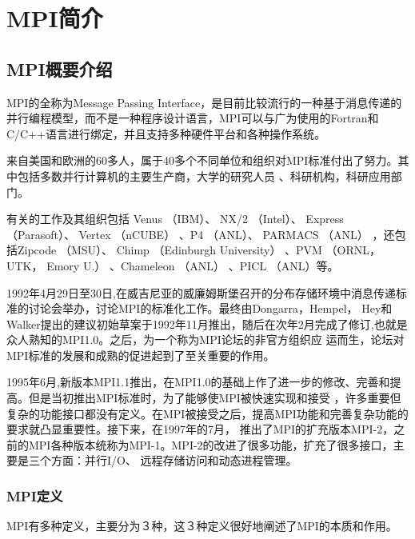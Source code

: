 
\chapter[MPI简介]{MPI简介}
\section{MPI概要介绍}
MPI的全称为Message Passing Interface，是目前比较流行的一种基于消息传递的并行编程模型，而不是一种程序设计语言，MPI可以与广为使用的Fortran和C/C++语言进行绑定，并且支持多种硬件平台和各种操作系统。

来自美国和欧洲的60多人，属于40多个不同单位和组织对MPI标准付出了努力。其中包括多数并行计算机的主要生产商，大学的研究人员
、科研机构，科研应用部门。

有关的工作及其组织包括 Venus （IBM）、 NX/2 （Intel）、 Express （Parasoft）、 Vertex （nCUBE） 、P4 （ANL）、 PARMACS （ANL） ，还包括Zipcode （MSU）、 Chimp （Edinburgh University） 、PVM （ORNL， UTK， Emory U.） 、Chameleon （ANL） 、PICL （ANL）等。

1992年4月29日至30日,在威吉尼亚的威廉姆斯堡召开的分布存储环境中消息传递标准的讨论会举办，讨论MPI的标准化工作。最终由Dongarra，Hempel，
Hey和Walker提出的建议初始草案于1992年11月推出，随后在次年2月完成了修订,也就是众人熟知的MPI1.0。之后，为一个称为MPI论坛的非官方组织应
运而生，论坛对MPI标准的发展和成熟的促进起到了至关重要的作用。

1995年6月,新版本MPI1.1推出，在MPI1.0的基础上作了进一步的修改、完善和提高。但是当初推出MPI标准时，为了能够使MPI被快速实现和接受
，许多重要但复杂的功能接口都没有定义。在MPI被接受之后，提高MPI功能和完善复杂功能的要求就凸显重要性。接下来，在1997年的7月，
推出了MPI的扩充版本MPI-2，之前的MPI各种版本统称为MPI-1。MPI-2的改进了很多功能，扩充了很多接口，主要是三个方面：并行I/O、
远程存储访问和动态进程管理。

\subsection{MPI定义}
MPI有多种定义，主要分为３种，这３种定义很好地阐述了MPI的本质和作用。

